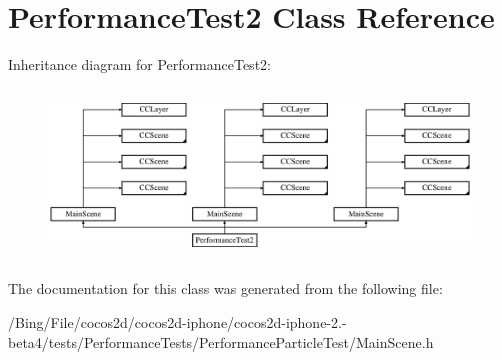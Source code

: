 \hypertarget{interface_performance_test2}{\section{Performance\-Test2 Class Reference}
\label{interface_performance_test2}
}
Inheritance diagram for Performance\-Test2\-:\begin{figure}[H]
\begin{center}
\leavevmode
\includegraphics[height=4.552845cm]{interface_performance_test2}
\end{center}
\end{figure}


The documentation for this class was generated from the following file\-:\begin{DoxyCompactItemize}
\item 
/\-Bing/\-File/cocos2d/cocos2d-\/iphone/cocos2d-\/iphone-\/2.-\/beta4/tests/\-Performance\-Tests/\-Performance\-Particle\-Test/Main\-Scene.\-h\end{DoxyCompactItemize}
